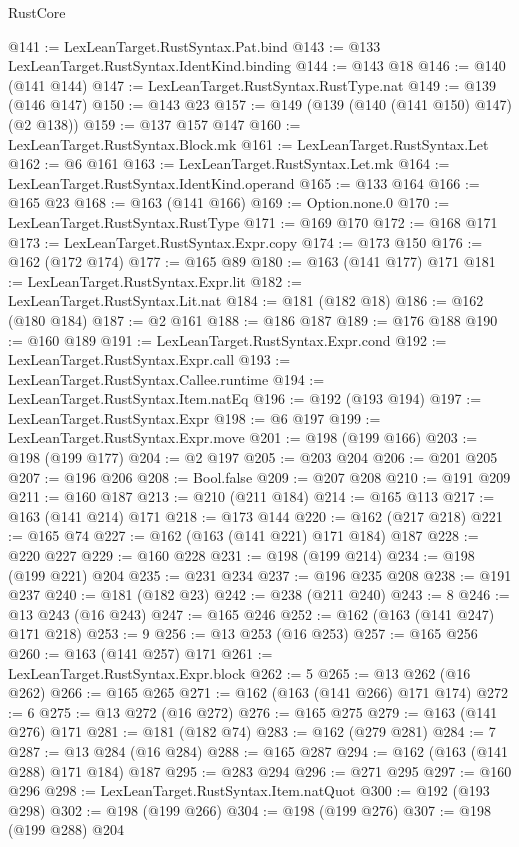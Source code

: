 \begin{lexlean}{RustCore}
\begin{coremodule}
@141 := LexLeanTarget.RustSyntax.Pat.bind
@143 := @133 LexLeanTarget.RustSyntax.IdentKind.binding
@144 := @143 @18
@146 := @140 (@141 @144)
@147 := LexLeanTarget.RustSyntax.RustType.nat
@149 := @139 (@146 @147)
@150 := @143 @23
@157 := @149 (@139 (@140 (@141 @150) @147) (@2 @138))
@159 := @137 @157 @147
@160 := LexLeanTarget.RustSyntax.Block.mk
@161 := LexLeanTarget.RustSyntax.Let
@162 := @6 @161
@163 := LexLeanTarget.RustSyntax.Let.mk
@164 := LexLeanTarget.RustSyntax.IdentKind.operand
@165 := @133 @164
@166 := @165 @23
@168 := @163 (@141 @166)
@169 := Option.none.{0}
@170 := LexLeanTarget.RustSyntax.RustType
@171 := @169 @170
@172 := @168 @171
@173 := LexLeanTarget.RustSyntax.Expr.copy
@174 := @173 @150
@176 := @162 (@172 @174)
@177 := @165 @89
@180 := @163 (@141 @177) @171
@181 := LexLeanTarget.RustSyntax.Expr.lit
@182 := LexLeanTarget.RustSyntax.Lit.nat
@184 := @181 (@182 @18)
@186 := @162 (@180 @184)
@187 := @2 @161
@188 := @186 @187
@189 := @176 @188
@190 := @160 @189
@191 := LexLeanTarget.RustSyntax.Expr.cond
@192 := LexLeanTarget.RustSyntax.Expr.call
@193 := LexLeanTarget.RustSyntax.Callee.runtime
@194 := LexLeanTarget.RustSyntax.Item.natEq
@196 := @192 (@193 @194)
@197 := LexLeanTarget.RustSyntax.Expr
@198 := @6 @197
@199 := LexLeanTarget.RustSyntax.Expr.move
@201 := @198 (@199 @166)
@203 := @198 (@199 @177)
@204 := @2 @197
@205 := @203 @204
@206 := @201 @205
@207 := @196 @206
@208 := Bool.false
@209 := @207 @208
@210 := @191 @209
@211 := @160 @187
@213 := @210 (@211 @184)
@214 := @165 @113
@217 := @163 (@141 @214) @171
@218 := @173 @144
@220 := @162 (@217 @218)
@221 := @165 @74
@227 := @162 (@163 (@141 @221) @171 @184) @187
@228 := @220 @227
@229 := @160 @228
@231 := @198 (@199 @214)
@234 := @198 (@199 @221) @204
@235 := @231 @234
@237 := @196 @235 @208
@238 := @191 @237
@240 := @181 (@182 @23)
@242 := @238 (@211 @240)
@243 := 8
@246 := @13 @243 (@16 @243)
@247 := @165 @246
@252 := @162 (@163 (@141 @247) @171 @218)
@253 := 9
@256 := @13 @253 (@16 @253)
@257 := @165 @256
@260 := @163 (@141 @257) @171
@261 := LexLeanTarget.RustSyntax.Expr.block
@262 := 5
@265 := @13 @262 (@16 @262)
@266 := @165 @265
@271 := @162 (@163 (@141 @266) @171 @174)
@272 := 6
@275 := @13 @272 (@16 @272)
@276 := @165 @275
@279 := @163 (@141 @276) @171
@281 := @181 (@182 @74)
@283 := @162 (@279 @281)
@284 := 7
@287 := @13 @284 (@16 @284)
@288 := @165 @287
@294 := @162 (@163 (@141 @288) @171 @184) @187
@295 := @283 @294
@296 := @271 @295
@297 := @160 @296
@298 := LexLeanTarget.RustSyntax.Item.natQuot
@300 := @192 (@193 @298)
@302 := @198 (@199 @266)
@304 := @198 (@199 @276)
@307 := @198 (@199 @288) @204

\end{coremodule}
\end{lexlean}

